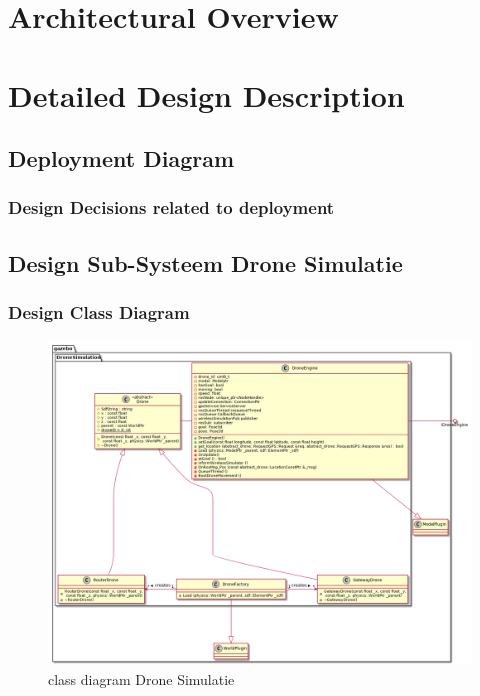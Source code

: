 \documentclass[a4paper, 11pt, oneside]{report}
\begin{document}
\chapter{Architectural Overview}
\label{architectural}
\chapter{Detailed Design Description}
\label{DetailedDesign}
\section{Deployment Diagram}
\label{DetailedDesign:deployment}
\subsection{Design Decisions related to deployment}
\label{DetailedDesign:deployment:decisisions}
\section{Design Sub-Systeem Drone Simulatie}
\label{DetailedDesign:DroneSimumlatie}
\subsection{Design Class Diagram}
\label{DetailedDesign:DroneSimumlatie:class}
\begin{figure}[H]
	\begin{center}\includegraphics[width=\linewidth]{UML/out/DroneSimulation/class/DroneSimClass/DroneSimClass.png}\end{center}
	\caption{class diagram Drone Simulatie}
	\label{fig:class:dronesimulatie}
\end{figure}
\end{document}

